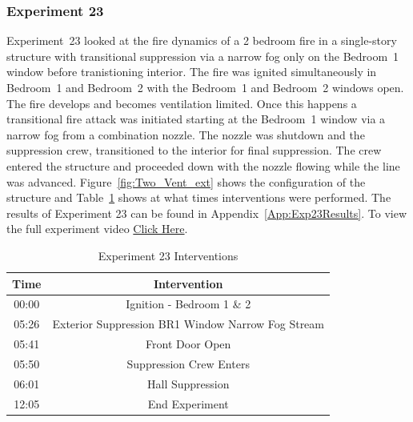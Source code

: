 \documentclass[12pt,oneside]{book}
\begin{document}
\subsubsection{Experiment 23}
Experiment~23 looked at the fire dynamics of a 2 bedroom fire in a single-story structure with transitional suppression via a narrow fog only on the Bedroom~1 window before tranistioning interior. The fire was ignited simultaneously in Bedroom~1 and Bedroom~2 with the Bedroom~1 and Bedroom~2 windows open. The fire develops and becomes ventilation limited. Once this happens a transitional fire attack was initiated starting at the Bedroom~1 window via a narrow fog from a combination nozzle. The nozzle was shutdown and the suppression crew, transitioned to the interior for final suppression. The crew entered the structure and proceeded down with the nozzle flowing while the line was advanced. Figure~\ref{fig:Two_Vent_ext} shows the configuration of the structure and Table~\ref{Table:Exp23Interventions} shows at what times interventions were performed. The results of Experiment 23 can be found in Appendix~\ref{App:Exp23Results}. To view the full experiment video \href{https://player.vimeo.com/video/170499625?autoplay=1}{Click Here}.

\begin{table}[H]
	\centering
	\caption{Experiment 23 Interventions}
	\begin{tabular}{|c|c|} 
		\hline
		Time & Intervention \\ \hline \hline
		00:00 & Ignition - Bedroom 1 \& 2 \\ \hline
		05:26 & Exterior Suppression BR1 Window Narrow Fog Stream \\ \hline
		05:41 & Front Door Open \\ \hline
		05:50 & Suppression Crew Enters\\ \hline
		06:01 & Hall Suppression \\ \hline 
		12:05 & End Experiment\\ \hline
	\end{tabular}
	\label{Table:Exp23Interventions}
\end{table}

\clearpage
\end{document}
